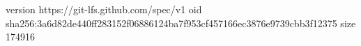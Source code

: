 version https://git-lfs.github.com/spec/v1
oid sha256:3a6d82de440ff283152f06886124ba7f953cf457166ec3876e9739cbb3f12375
size 174916
